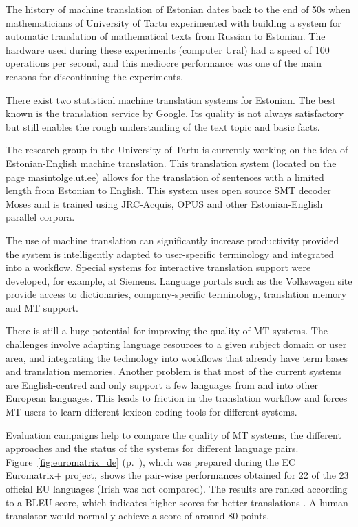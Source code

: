 \documentclass[]{../metanetpaper}
\begin{document}
\begin{multicols}{2}
The history of machine translation of Estonian dates back to the end of 50s when mathematicians of University of Tartu experimented with building a system for automatic translation of mathematical texts from Russian to Estonian. 
The hardware used during these experiments (computer Ural) had a speed of 100 operations per second, and this mediocre performance was one of the main reasons for discontinuing the experiments.

There exist two statistical machine translation systems for Estonian. 
The best known is the translation service by Google. 
Its quality is not always satisfactory but still enables the rough understanding of the text topic and basic facts.

The research group in the University of Tartu is currently working on the idea of Estonian-English machine translation. 
This translation system (located on the page masintolge.ut.ee) allows for the translation of sentences with a limited length from Estonian to English. 
This system uses open source SMT decoder Moses and is trained using JRC-Acquis, OPUS and other Estonian-English parallel corpora.

The use of machine translation can significantly increase productivity provided the system is intelligently adapted to user-specific terminology and integrated into a workflow. 
Special systems for interactive translation support were developed, for example, at Siemens. 
Language portals such as the Volkswagen site provide access to dictionaries, company-specific terminology, translation memory and MT support. 

There is still a huge potential for improving the quality of MT systems. The challenges involve adapting language resources to a given subject domain or user area, and integrating the technology into workflows that already have term bases and translation memories. Another problem is that most of the current systems are English-centred and only support a few languages from and into other European languages. This leads to friction in the translation workflow and forces MT users to learn different lexicon coding tools for different systems.

Evaluation campaigns help to compare the quality of MT systems, the different approaches and the status of the systems for different language pairs. Figure~\ref{fig:euromatrix_de} (p.~\pageref{fig:euromatrix_de}), which was prepared during the EC Euromatrix+ project, shows the pair-wise performances obtained for 22 of the 23 official EU languages (Irish was not compared). The results are ranked according to a BLEU score, which indicates higher scores for better translations \cite{bleu1}. A human translator would normally achieve a score of around 80 points.


\end{multicols}
\end{document}
